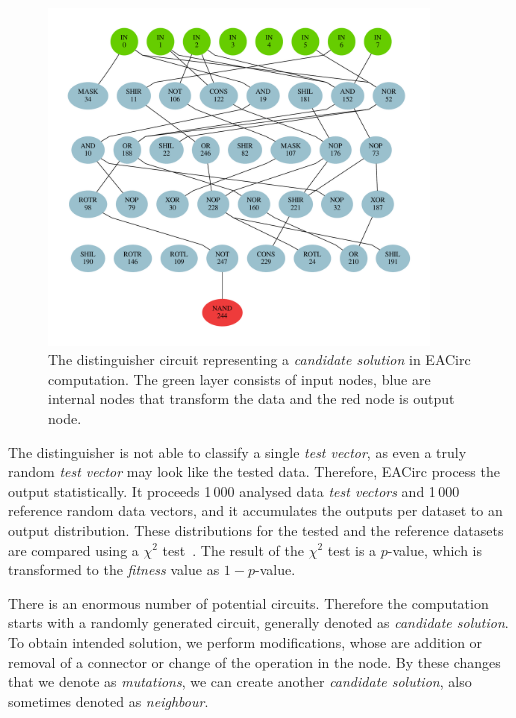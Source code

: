 \documentclass[
    digital,    %
    oneside,    %
    color,
    11pt,
    nocover,
    notable,
    nolof,
    nolot,
]{fithesis3}
\begin{document}
\begin{figure}[h]
  \centering
  \includegraphics[width=0.9\textwidth]{./graphics/gls/circuit}
\caption{The distinguisher circuit representing a \textit{candidate solution} in EACirc computation. The green layer consists of input nodes, blue are internal nodes that transform the data and the red node is output node.}
\label{fig:eac-circuit}
\end{figure}

The distinguisher is not able to classify a single \textit{test vector}, as even a truly random \textit{test vector} may look like the tested data. Therefore, EACirc process the output statistically. It proceeds 1\,000 analysed data \textit{test vectors} and 1\,000 reference random data vectors, and it accumulates the outputs per dataset to an output distribution. These distributions for the tested and the reference datasets are compared using a $\chi^{2}$ test~\cite[p.~219]{stat-handbook}. The result of the $\chi^{2}$ test is a $p$-value, which is transformed to the \textit{fitness} value as $1 - p$-value.

There is an enormous number of potential circuits. Therefore the computation starts with a randomly generated circuit, generally denoted as \textit{candidate solution}. To obtain intended solution, we perform modifications, whose are addition or removal of a connector or change of the operation in the node. By these changes that we denote as \textit{mutations}, we can create another \textit{candidate solution}, also sometimes denoted as \textit{neighbour}.
\end{document}
